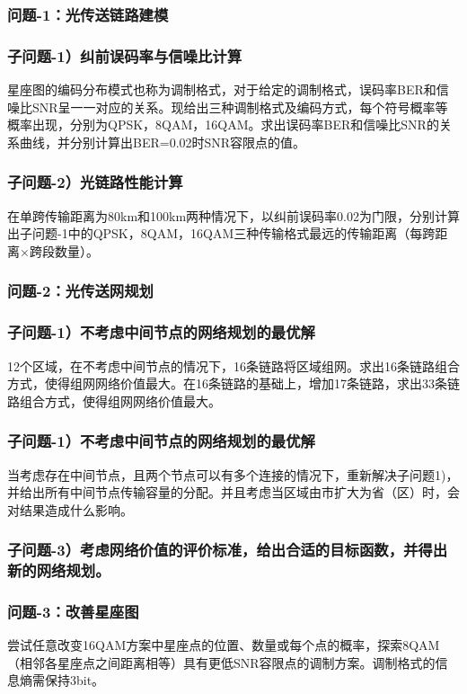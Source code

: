 \documentclass[bwprint]{gmcmthesis}
\numberwithin{equation}{section}
\begin{document}
\subsubsection{问题-1：光传送链路建模}
\subsubsection*{子问题-1）纠前误码率与信噪比计算}

星座图的编码分布模式也称为调制格式，对于给定的调制格式，误码率BER和信噪比SNR呈一一对应的关系。现给出三种调制格式及编码方式，每个符号概率等概率出现，分别为QPSK，8QAM，16QAM。求出误码率BER和信噪比SNR的关系曲线，并分别计算出BER=0.02时SNR容限点的值。

\subsubsection*{子问题-2）光链路性能计算}
在单跨传输距离为80km和100km两种情况下，以纠前误码率0.02为门限，分别计算出子问题-1中的QPSK，8QAM，16QAM三种传输格式最远的传输距离（每跨距离×跨段数量）。


\subsubsection{问题-2：光传送网规划}
\subsubsection*{子问题-1）不考虑中间节点的网络规划的最优解}
12个区域，在不考虑中间节点的情况下，16条链路将区域组网。求出16条链路组合方式，使得组网网络价值最大。在16条链路的基础上，增加17条链路，求出33条链路组合方式，使得组网网络价值最大。

\subsubsection*{子问题-1）不考虑中间节点的网络规划的最优解}
当考虑存在中间节点，且两个节点可以有多个连接的情况下，重新解决子问题1)，并给出所有中间节点传输容量的分配。并且考虑当区域由市扩大为省（区）时，会对结果造成什么影响。

\subsubsection*{子问题-3）考虑网络价值的评价标准，给出合适的目标函数，并得出新的网络规划。}

\newpage



\subsubsection{问题-3：改善星座图}
尝试任意改变16QAM方案中星座点的位置、数量或每个点的概率，探索8QAM（相邻各星座点之间距离相等）具有更低SNR容限点的调制方案。调制格式的信息熵需保持3bit。
\end{document}

